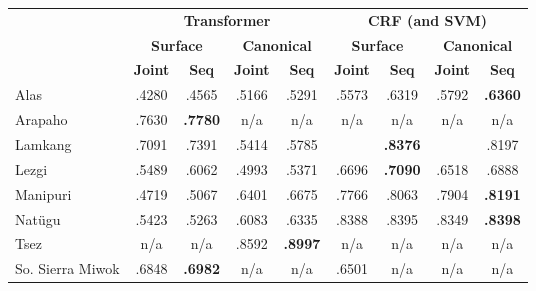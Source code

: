 \begin{table}[!tb]
    \centering
    \begin{tabular}{l|cc|cc|cc|cc}
          & \multicolumn{4}{c|}{\textbf{Transformer}} & \multicolumn{4}{c}{\textbf{CRF (and SVM)}} 
          \\
          & \multicolumn{2}{c|}{\textbf{Surface}} & \multicolumn{2}{c|}{\textbf{Canonical}}  & \multicolumn{2}{c|}{\textbf{Surface}} & \multicolumn{2}{c}{\textbf{Canonical}} 
          \\
          &  \textbf{Joint} & \textbf{Seq} &  \textbf{Joint} & \textbf{Seq} &  \textbf{Joint} & \textbf{Seq} &  \textbf{Joint} & \textbf{Seq} \\
         \hline
         Alas & .4280 & .4565 & .5166 & .5291 
              & .5573 & .6319 & .5792 & \textbf{.6360} \\
         \hline
         Arapaho & .7630 & \textbf{.7780} & n/a & n/a 
                 & n/a & n/a & n/a & n/a  \\
         \hline
         Lamkang & .7091 & .7391 & .5414 & .5785 
         &  & \textbf{.8376} &  & .8197 \\
         \hline
         Lezgi  & .5489 & .6062 & .4993 & .5371 
                & .6696 & \textbf{.7090} & .6518 & .6888 \\
         \hline
         Manipuri & .4719 & .5067 & .6401 & .6675 
                  & .7766 & .8063 & .7904 & \textbf{.8191} \\
         \hline
         Natügu & .5423 & .5263 & .6083 & .6335 
                & .8388 & .8395 & .8349 & \textbf{.8398} \\
         \hline
         Tsez & n/a & n/a & .8592 & \textbf{.8997} 
              & n/a & n/a & n/a & n/a \\
         \hline
         So. Sierra Miwok & .6848 & \textbf{.6982} & n/a & n/a 
                          & .6501 & n/a & n/a & n/a \\

\end{tabular}
\end{table}
